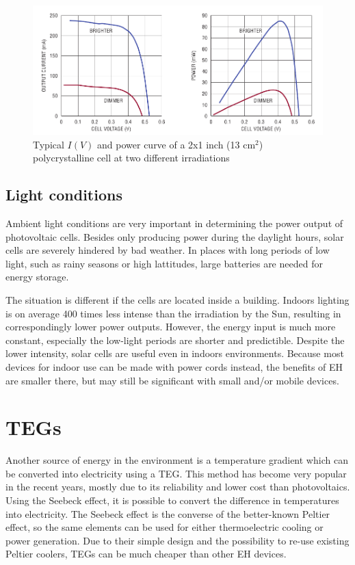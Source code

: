 \documentclass[a4paper,10pt]{article}
\begin{document}
\begin{figure}[h!]
\includegraphics[width=\textwidth]{./Slike/PV-power-curve}
 \caption{Typical $I(V)$ and power curve of a 2x1 inch (13 cm$^2$) polycrystalline cell at two different irradiations~\cite{Burgoine11}}
\label{fig:pv-power-curve}
\end{figure}

\subsection{Light conditions}

Ambient light conditions are very important in determining the power output of photovoltaic cells. Besides only producing power during the daylight hours, solar cells are severely hindered by bad weather. In places with long periods of low light, such as rainy seasons or high lattitudes, large batteries are needed for energy storage. 

The situation is different if the cells are located inside a building. Indoors lighting is on average 400 times less intense than the irradiation by the Sun, resulting in correspondingly lower power outputs. However, the energy input is much more constant, especially the low-light periods are shorter and predictible. Despite the lower intensity, solar cells are useful even in indoors environments. Because most devices for indoor use can be made with power cords instead, the benefits of \ac{EH} are smaller there, but may still be significant with small and/or mobile devices. 

\section{\aclp{TEG}}


Another source of energy in the environment is a temperature gradient which can be converted into electricity using a \ac{TEG}. This method has become very popular in the recent years, mostly due to its reliability and lower cost than photovoltaics. Using the Seebeck effect, it is possible to convert the difference in temperatures into electricity.  The Seebeck effect is the converse of the better-known Peltier effect, so the same elements can be used for either thermoelectric cooling or power generation. Due to their simple design and the possibility to re-use existing Peltier coolers, \acp{TEG} can be much cheaper than other \ac{EH} devices. 
\end{document}
